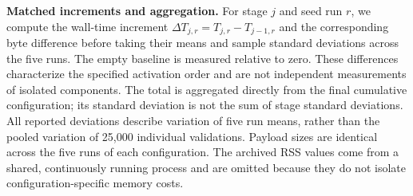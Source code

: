 \noindent\textbf{Matched increments and aggregation.}
For stage $j$ and seed run $r$, we compute the wall-time increment
$\Delta T_{j,r}=T_{j,r}-T_{j-1,r}$ and the corresponding byte difference
before taking their means and sample standard deviations across the five runs.
The empty baseline is measured relative to zero.
These differences characterize the specified activation order and are not
independent measurements of isolated components.
The total is aggregated directly from the final cumulative configuration;
its standard deviation is not the sum of stage standard deviations.
All reported deviations describe variation of five run means, rather than
the pooled variation of 25,000 individual validations.
Payload sizes are identical across the five runs of each configuration.
The archived RSS values come from a shared, continuously running process and
are omitted because they do not isolate configuration-specific memory costs.


